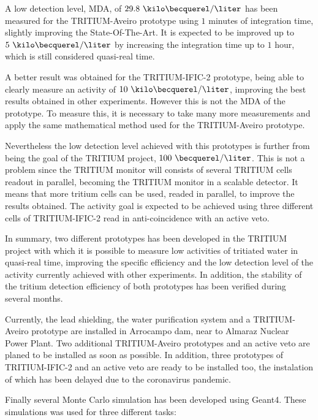 A low detection level, MDA, of $29.8~\kilo\becquerel/\liter$ has been measured for the TRITIUM-Aveiro prototype using $1$ minutes of integration time, slightly improving the State-Of-The-Art. It is expected to be improved up to $5~\kilo\becquerel/\liter$ by increasing the integration time up to $1$ hour, which is still considered quasi-real time.

A better result was obtained for the TRITIUM-IFIC-2 prototype, being able to clearly measure an activity of $10~\kilo\becquerel/\liter$, improving the best results obtained in other experiments. However this is not the MDA of the prototype. To measure this, it is necessary to take many more measurements and apply the same mathematical method used for the TRITIUM-Aveiro prototype.

Nevertheless the low detection level achieved with this prototypes is further from being the goal of the TRITIUM project, $100~\becquerel/\liter$. This is not a problem since the TRITIUM monitor will consists of several TRITIUM cells readout in parallel, becoming the TRITIUM monitor in a scalable detector. It means that more tritium cells can be used, readed in parallel, to improve the results obtained. The activity goal is expected to be achieved using three different cells of TRITIUM-IFIC-2 read in anti-coincidence with an active veto.

In summary, two different prototypes has been developed in the TRITIUM project with which it is possible to measure low activities of tritiated water in quasi-real time, improving the specific efficiency and the low detection level of the activity currently achieved with other experiments. In addition, the stability of the tritium detection efficiency of both prototypes has been verified during several months.

Currently, the lead shielding, the water purification system and a TRITIUM-Aveiro prototype are installed in Arrocampo dam, near to Almaraz Nuclear Power Plant. Two additional TRITIUM-Aveiro prototypes and an active veto are planed to be installed as soon as possible. In addition, three prototypes of TRITIUM-IFIC-2 and an active veto are ready to be installed too, the instalation of which has been delayed due to the coronavirus pandemic.

Finally several Monte Carlo simulation has been developed using Geant4. These simulations was used for three different tasks:

